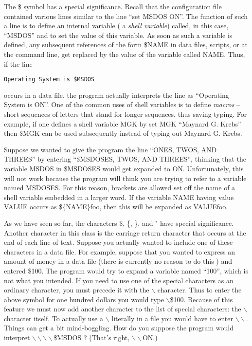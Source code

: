 The \$ symbol has a special significance. Recall that the configuration
file contained various lines similar to the line ``set MSDOS ON''. The
function of such a line is to define an internal variable (  a 
{\it shell variable}) called, in this case, ``MSDOS'' and
to set the value of this variable. As soon as such a variable is defined,
any subsequent references of the form \$NAME in data files, scripts, or
at the command line, get replaced by the value of the variable called
NAME. Thus, if
the line
\smallskip
\begin{verbatim}
Operating System is $MSDOS 
\end{verbatim}
\smallskip
occurs in a data file, the program actually interprets the line as
``Operating System is ON''. One of the common uses of shell variables is
to define {\it macros} -- short sequences of letters that stand for longer
sequences, thus saving typing. For example, if one defines a shell variable
MGK by set MGK ``Maynard G. Krebs'' then \$MGK can be used subsequently 
instead of typing out Maynard G. Krebs. 

Suppose we wanted to give the program the line ``ONES, TWOS, AND THREES''
by entering ``\$MSDOSES, TWOS, AND THREES'', thinking that the variable
MSDOS in \$MSDOSES would get expanded to ON. Unfortunately, this will
not work because the program will think you are trying to refer to
a variable named MSDOSES. For this reason, brackets are allowed set off the
name of a shell variable embedded in a larger word. If the variable NAME
having value VALUE occurs as \$\{NAME\}foo, then this will be expanded as
VALUEfoo. 

As we have seen so far, the characters \$, \{, \}, and " have special
significance. Another character in this class is the carriage return character
that occurs at the end of each line of text. Suppose you actually wanted
to include one of these characters in a data file. For example, suppose
that you wanted to express an amount of money in a data file (there is
currently no reason to do this ) and entered \$100. The program would try
to expand a variable named ``100'', which is not what you intended. If you
need to use one of the special characters as an ordinary character, you 
must precede it with the $\backslash$ character. Thus to enter the above
symbol for one hundred dollars you would type $\backslash$\$100. Because
of this feature we must now add another character to the list of special
characters: the $\backslash$ character itself. To actually use a 
$\backslash$ literally in a file you would have to enter $\backslash\backslash$.
 Things can get a bit mind-boggling. How do you suppose the program would
interpret $\backslash\backslash\backslash\backslash$\$MSDOS ? (That's
right,  $\backslash\backslash$ON.)

